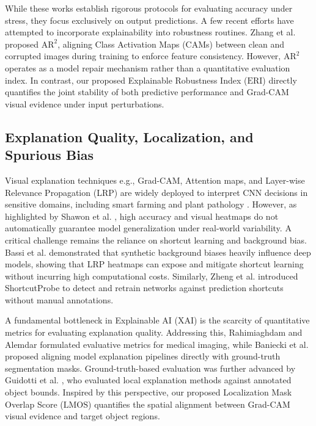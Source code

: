 \documentclass[a4paper,fleqn]{cas-dc}
\begin{document}
	While these works establish rigorous protocols for evaluating accuracy under stress, they focus exclusively on output predictions. 
	A few recent efforts have attempted to incorporate explainability into robustness routines. 
	Zhang et al. \cite{r56} proposed $\mathrm{AR^2}$, aligning Class Activation Maps (CAMs) between clean and corrupted images during training to enforce feature consistency. 
	However, $\mathrm{AR^2}$ operates as a model repair mechanism rather than a quantitative evaluation index. 
	In contrast, our proposed Explainable Robustness Index ($\mathrm{ERI}$) directly quantifies the joint stability of both predictive performance and Grad-CAM visual evidence under input perturbations.

	\subsection{Explanation Quality, Localization, and Spurious Bias}
	Visual explanation techniques e.g., Grad-CAM, Attention maps, and Layer-wise Relevance Propagation (LRP) are widely deployed to interpret CNN decisions in sensitive domains, including smart farming and plant pathology \cite{r57, r58, r59}. 
	However, as highlighted by Shawon et al. \cite{r59}, high accuracy and visual heatmaps do not automatically guarantee model generalization under real-world variability. 
	A critical challenge remains the reliance on shortcut learning and background bias. 
	Bassi et al. \cite{r11} demonstrated that synthetic background biases heavily influence deep models, showing that LRP heatmaps can expose and mitigate shortcut learning without incurring high computational costs. 
	Similarly, Zheng et al. \cite{r60} introduced ShortcutProbe to detect and retrain networks against prediction shortcuts without manual annotations.
	
	A fundamental bottleneck in Explainable AI (XAI) is the scarcity of quantitative metrics for evaluating explanation quality. 
	Addressing this, Rahimiaghdam and Alemdar \cite{ref22} formulated evaluative metrics for medical imaging, while Baniecki et al. \cite{r61} proposed aligning model explanation pipelines directly with ground-truth segmentation masks. 
	Ground-truth-based evaluation was further advanced by Guidotti et al. \cite{ref24}, who evaluated local explanation methods against annotated object bounds. 
	Inspired by this perspective, our proposed Localization Mask Overlap Score ($\mathrm{LMOS}$) quantifies the spatial alignment between Grad-CAM visual evidence and target object regions. 
	
\end{document}
